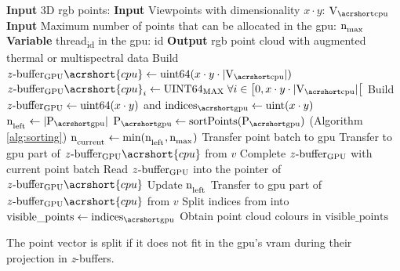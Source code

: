 \begin{algorithm}
    \small
    \begin{algorithmic}[1]
        \State \textbf{Input} 3D \acrshort{rgb} points: \Points %
    	\State \textbf{Input} Viewpoints with dimensionality $x \cdot y$: $\Viewpoints$ %
    	\State \textbf{Input} Maximum number of points that can be allocated in the \acrshort{gpu}: $\textrm{n}_\textsubscript{max}$ %
        \State \textbf{Variable} \textrm{thread}\textsubscript{id} in the \acrshort{gpu}: id %
        \State \textbf{Output} \acrshort{rgb} point cloud with augmented thermal or multispectral data %
        \State Build $\Zbuffer\acrshort{cpu} \gets \textrm{uint64}(x \cdot y \cdot |\Viewpoints|)$ %
        \State $\Zbuffer\acrshort{cpu}_{i} \gets \textrm{UINT64\textsubscript{MAX}} \Space \forall i \in \left[0, x \cdot y \cdot |\Viewpoints|\right[$ %
        \State Build $z\textrm{-buffer}\textsubscript{GPU} \gets \textrm{uint64}(x \cdot y)$ and $\Indices \gets \textrm{uint}(x \cdot y)$ %
        \State $\LeftPoints \gets \PCCardinality$ %
            \State $\Points \gets \textrm{sortPoints}(\Points)$   \Comment(Algorithm \ref{alg:sorting}) %
        \EndIf
            \State $\textrm{n}_\textsubscript{current} \gets \textrm{min}(\textrm{n}_\textsubscript{left}, \textrm{n}_\textsubscript{max})$ %
            \State Transfer point batch to \acrshort{gpu} %
                \State Transfer to \acrshort{gpu} part of $\Zbuffer\acrshort{cpu}$ from $v$ %
                \State Complete $z\textrm{-buffer}\textsubscript{GPU}$ with current point batch %
                \State Read $z\textrm{-buffer}\textsubscript{GPU}$ into the pointer of $\Zbuffer\acrshort{cpu}$ %
            \EndFor
            \State Update $\textrm{n}_\textsubscript{left}$ %
        \EndWhile
            \State Transfer to \acrshort{gpu} part of $\Zbuffer\acrshort{cpu}$ from $v$ %
            \State Split indices from \Zbuffer \hspace{1mm} into \Indices %
            \State $\textrm{visible\_points} \gets \Indices$ %
            \State Obtain point cloud colours in $\textrm{visible\_points}$ %
        \EndFor
        \caption{The point vector is split if it does not fit in the \acrshort{gpu}'s \acrshort{vram} during their projection in \textit{z}-buffers.}
        \label{alg:gpu_multiple_batch}
      \end{algorithmic}
      \normalsize
\end{algorithm}

